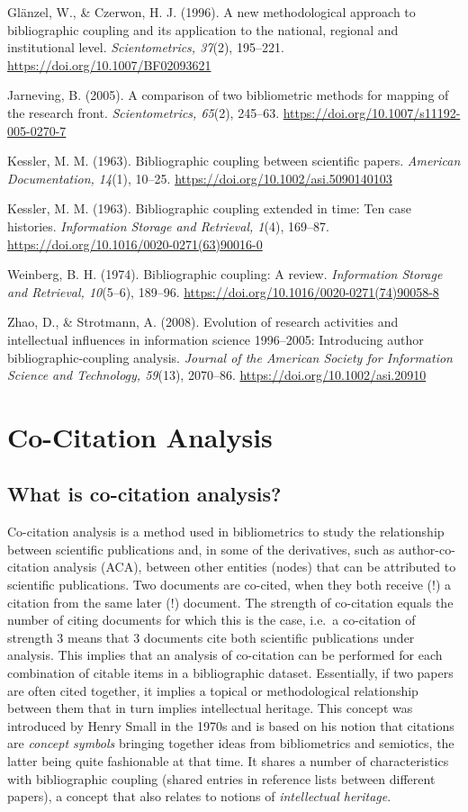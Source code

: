 \documentclass[
  letterpaper,
]{scrreprt}
\begin{document}
Glänzel, W., \& Czerwon, H. J. (1996). A new methodological approach to
bibliographic coupling and its application to the national, regional and
institutional level. \emph{Scientometrics, 37}(2), 195--221.
\url{https://doi.org/10.1007/BF02093621}

Jarneving, B. (2005). A comparison of two bibliometric methods for
mapping of the research front. \emph{Scientometrics, 65}(2), 245--63.
\url{https://doi.org/10.1007/s11192-005-0270-7}

Kessler, M. M. (1963). Bibliographic coupling between scientific papers.
\emph{American Documentation, 14}(1), 10--25.
\url{https://doi.org/10.1002/asi.5090140103}

Kessler, M. M. (1963). Bibliographic coupling extended in time: Ten case
histories. \emph{Information Storage and Retrieval, 1}(4), 169--87.
\url{https://doi.org/10.1016/0020-0271(63)90016-0}

Weinberg, B. H. (1974). Bibliographic coupling: A review.
\emph{Information Storage and Retrieval, 10}(5--6), 189--96.
\url{https://doi.org/10.1016/0020-0271(74)90058-8}

Zhao, D., \& Strotmann, A. (2008). Evolution of research activities and
intellectual influences in information science 1996--2005: Introducing
author bibliographic-coupling analysis. \emph{Journal of the American
Society for Information Science and Technology, 59}(13), 2070--86.
\url{https://doi.org/10.1002/asi.20910}

\chapter{Co-Citation Analysis}\label{co-citation-analysis}

\section{What is co-citation
analysis?}\label{what-is-co-citation-analysis}

Co-citation analysis is a method used in bibliometrics to study the
relationship between scientific publications and, in some of the
derivatives, such as author-co-citation analysis (ACA), between other
entities (nodes) that can be attributed to scientific publications. Two
documents are co-cited, when they both receive (!) a citation from the
same later (!) document. The strength of co-citation equals the number
of citing documents for which this is the case, i.e.~a co-citation of
strength 3 means that 3 documents cite both scientific publications
under analysis. This implies that an analysis of co-citation can be
performed for each combination of citable items in a bibliographic
dataset. Essentially, if two papers are often cited together, it implies
a topical or methodological relationship between them that in turn
implies intellectual heritage. This concept was introduced by Henry
Small in the 1970s and is based on his notion that citations are
\emph{concept symbols} bringing together ideas from bibliometrics and
semiotics, the latter being quite fashionable at that time. It shares a
number of characteristics with bibliographic coupling (shared entries in
reference lists between different papers), a concept that also relates
to notions of \emph{intellectual heritage}.
\end{document}
